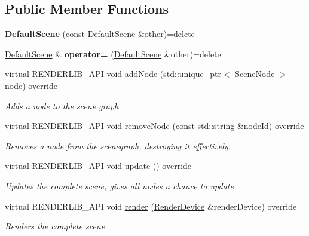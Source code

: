 \subsection*{Public Member Functions}
\begin{DoxyCompactItemize}
\item 
\mbox{\label{class_default_scene_a4b1d299c3da3a3e1b1bff200c2318817}} 
{\bfseries Default\+Scene} (const \hyperlink{class_default_scene}{Default\+Scene} \&other)=delete
\item 
\mbox{\label{class_default_scene_aee5e01122ca501009367babfffbd7a98}} 
\hyperlink{class_default_scene}{Default\+Scene} \& {\bfseries operator=} (\hyperlink{class_default_scene}{Default\+Scene} \&other)=delete
\item 
\mbox{\label{class_default_scene_a0de40100cc0236f656cdaf80d5ff477f}} 
virtual R\+E\+N\+D\+E\+R\+L\+I\+B\+\_\+\+A\+PI void \hyperlink{class_default_scene_a0de40100cc0236f656cdaf80d5ff477f}{add\+Node} (std\+::unique\+\_\+ptr$<$ \hyperlink{class_scene_node}{Scene\+Node} $>$ node) override
\begin{DoxyCompactList}\small\item\em Adds a node to the scene graph. \end{DoxyCompactList}\item 
\mbox{\label{class_default_scene_a879ed798a8efe945ffb3624f5692e15b}} 
virtual R\+E\+N\+D\+E\+R\+L\+I\+B\+\_\+\+A\+PI void \hyperlink{class_default_scene_a879ed798a8efe945ffb3624f5692e15b}{remove\+Node} (const std\+::string \&node\+Id) override
\begin{DoxyCompactList}\small\item\em Removes a node from the scenegraph, destroying it effectively. \end{DoxyCompactList}\item 
\mbox{\label{class_default_scene_afb05291c5c6acae4c29abffe8ea30136}} 
virtual R\+E\+N\+D\+E\+R\+L\+I\+B\+\_\+\+A\+PI void \hyperlink{class_default_scene_afb05291c5c6acae4c29abffe8ea30136}{update} () override
\begin{DoxyCompactList}\small\item\em Updates the complete scene, gives all nodes a chance to update. \end{DoxyCompactList}\item 
\mbox{\label{class_default_scene_a403105049cb05f5f1144e029cd915297}} 
virtual R\+E\+N\+D\+E\+R\+L\+I\+B\+\_\+\+A\+PI void \hyperlink{class_default_scene_a403105049cb05f5f1144e029cd915297}{render} (\hyperlink{class_render_device}{Render\+Device} \&render\+Device) override
\begin{DoxyCompactList}\small\item\em Renders the complete scene. \end{DoxyCompactList}\end{DoxyCompactItemize}


